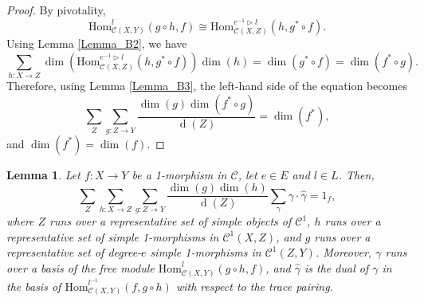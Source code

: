\documentclass[a4paper, oneside]{amsart}
\DeclareMathOperator{\wdim}{d}
\numberwithin{equation}{subsection}
\theoremstyle{referencedlemma}
\theoremstyle{plain} %
\newtheorem{lem}[equation]{Lemma}
\theoremstyle{remark}
\begin{document}
\begin{proof}
By pivotality, 
$$
\mathrm{Hom}_{\mathcal{C}(X,Y)}^l(g\circ h, f) \cong \mathrm{Hom}_{\mathcal{C}(X,Z)}^{e^{-1}\triangleright l}(h, g^*\circ f).
$$
Using Lemma \ref{Lemma_B2}, we have
$$
\sum_{h\colon X\to Z}\dim(\mathrm{Hom}_{\mathcal{C}(X,Z)}^{e^{-1}\triangleright l}(h, g^*\circ f))\dim(h) = \dim(g^*\circ f) = \dim(f^*\circ g).
$$
Therefore, using Lemma \ref{Lemma_B3}, the left-hand side of the equation becomes
$$
\sum_Z \sum_{g\colon Z \to Y}\frac{\dim(g)\dim(f^*\circ g)}{\wdim(Z)} = \dim(f^*),
$$
and $\dim(f^*) = \dim(f)$. 

\end{proof}

\begin{lem}\label{Lemma_B7}
Let $f\colon X\to Y$ be a 1-morphism in $\mathcal{C}$, let $e\in E$ and $l\in L$.  Then,
$$
\sum_Z  \sum_{h\colon X\to Z} \sum_{g\colon Z\to Y} \frac{\dim(g)\dim(h)}{\wdim(Z)}\sum_{\gamma} \gamma\cdot \hat{\gamma} = 1_f,
$$
where $Z$ runs over a representative set of simple objects of $\mathcal{C}^1$, $h$ runs over a representative set of simple 1-morphisms in $\mathcal{C}^1(X,Z)$, and $g$ runs over a representative set of degree-$e$ simple 1-morphisms in $\mathcal{C}^1(Z,Y)$. Moreover, $\gamma$ runs over a basis of the free module $\mathrm{Hom}^l_{\mathcal{C}(X,Y)}(g\circ h, f)$, and $\hat{\gamma}$ is the dual of $\gamma$ in the basis of \mbox{$\mathrm{Hom}^{l^{-1}}_{\mathcal{C}(X,Y)}(f, g\circ h)$} with respect to the trace pairing. 
\end{lem}
\end{document}
